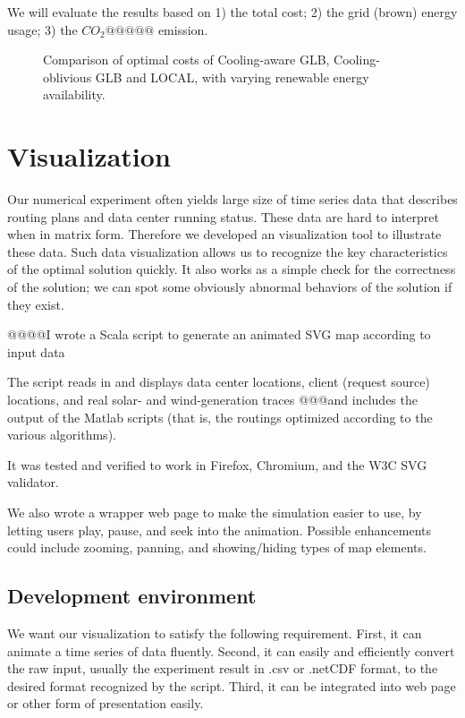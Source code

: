 \documentclass{acm_proc_article-sp}
\begin{document}
We will evaluate the results based on 1) the total cost; 2) the grid (brown) energy usage; 3) the $CO_2@@@@@$ emission.


\begin{figure*}
\centering
{}
\caption{Comparison of optimal costs of Cooling-aware GLB, Cooling-oblivious GLB and LOCAL, with varying renewable energy availability.}
\end{figure*}
\section{Visualization}
Our numerical experiment often yields large size of time series data that describes routing plans and data center running status. These data are hard to interpret when in matrix form. Therefore we developed an visualization tool to illustrate these data. Such data visualization allows us to recognize the key characteristics of the optimal solution quickly. It also works as a simple check for the correctness of the solution; we can spot some obviously abnormal behaviors of the solution if they exist.


@@@@I wrote a Scala script to generate an animated SVG map according to input data

The script reads in and displays data center locations, client (request source) locations, and real solar- and wind-generation traces @@@and includes the output of the Matlab scripts (that is, the routings optimized according to the various algorithms).

It was tested and verified to work in Firefox, Chromium, and the W3C SVG validator.

We also wrote a wrapper web page to make the simulation easier to use, by letting users play, pause, and seek into the animation. Possible enhancements could include zooming, panning, and showing/hiding types of map elements.


\subsection{Development environment}
We want our visualization to satisfy the following requirement. First, it can animate a time series of data fluently. Second, it can easily and efficiently convert the raw input, usually the experiment result in .csv or .netCDF format, to the desired format recognized by the script. Third, it can be integrated into web page or other form of presentation easily.
\end{document}
